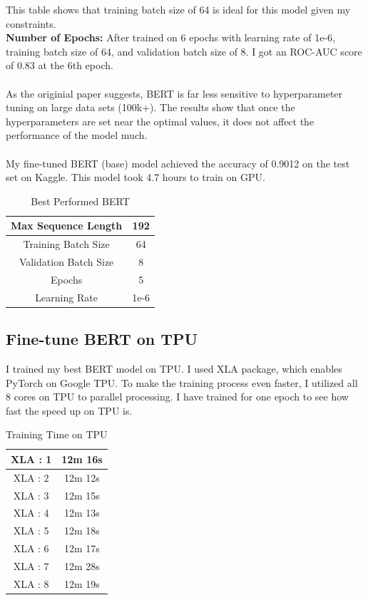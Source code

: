 \documentclass[11pt,a4paper]{article}
\begin{document}
\noindent This table shows that training batch size of 64 is ideal for this model given my constraints.\\

\noindent \textbf {Number of Epochs: }  After trained on 6 epochs with learning rate of 1e-6, training batch size of 64, and validation batch size of 8. I got an ROC-AUC score of 0.83 at the 6th epoch.\\
\\
 As the originial paper suggests, BERT is far less sensitive to hyperparameter tuning on large data sets (100k+)\cite{BERT}. The results show that once the hyperparameters are set near the optimal values, it does not affect the performance of the model much.\\
\\
\noindent My fine-tuned BERT (base) model achieved the accuracy of 0.9012 on the test set on Kaggle. This model took 4.7 hours to train on GPU.\\

\begin{table}[!htbp]
	\centering
	\begin{tabular}{|c|c|}
		\hline
		{Max Sequence Length}   & 192  \\ \hline
		{Training Batch Size}   & 64   \\ \hline
		{Validation Batch Size} & 8    \\ \hline
		{Epochs}                & 5    \\ \hline
		{Learning Rate}         & 1e-6 \\ \hline
	\end{tabular}
	\caption{\label{table:my-label} Best Performed BERT}
\end{table}


\subsection{Fine-tune BERT on TPU}

I trained my best BERT model on TPU. I used XLA package, which enables PyTorch on Google TPU. To make the training process even faster, I utilized all 8 cores on TPU to parallel processing. I have trained for one epoch to see how fast the speed up on TPU is.\\

\begin{table}[!htbp]
	\centering
	\begin{tabular}{|c|c|}
		\hline
		{XLA : 1} & 12m 16s \\ \hline
		{XLA : 2} & 12m 12s \\ \hline
		{XLA : 3} & 12m 15s \\ \hline
		{XLA : 4} & 12m 13s \\ \hline
		{XLA : 5} & 12m 18s \\ \hline
		{XLA : 6} & 12m 17s \\ \hline
		{XLA : 7} & 12m 28s \\ \hline
		{XLA : 8} & 12m 19s \\ \hline
	\end{tabular}
	\caption{\label{table:my-label} Training Time on TPU}
\end{table}
\end{document}
